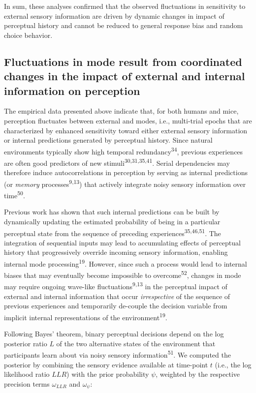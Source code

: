 \documentclass[
]{article}
\begin{document}
In sum, these analyses confirmed that the observed fluctuations in
sensitivity to external sensory information are driven by dynamic
changes in impact of perceptual history and cannot be reduced to general
response bias and random choice behavior.

\hypertarget{fluctuations-in-mode-result-from-coordinated-changes-in-the-impact-of-external-and-internal-information-on-perception}{%
\subsection{Fluctuations in mode result from coordinated changes in the
impact of external and internal information on
perception}\label{fluctuations-in-mode-result-from-coordinated-changes-in-the-impact-of-external-and-internal-information-on-perception}}

The empirical data presented above indicate that, for both humans and
mice, perception fluctuates between external and modes, i.e.,
multi-trial epochs that are characterized by enhanced sensitivity toward
either external sensory information or internal predictions generated by
perceptual history. Since natural environments typically show high
temporal redundancy\textsuperscript{34}, previous experiences are often
good predictors of new stimuli\textsuperscript{30,31,35,41}. Serial
dependencies may therefore induce autocorrelations in perception by
serving as internal predictions (or \emph{memory}
processes\textsuperscript{9,13}) that actively integrate noisy sensory
information over time\textsuperscript{50}.

Previous work has shown that such internal predictions can be built by
dynamically updating the estimated probability of being in a particular
perceptual state from the sequence of preceding
experiences\textsuperscript{35,46,51}. The integration of sequential
inputs may lead to accumulating effects of perceptual history that
progressively override incoming sensory information, enabling internal
mode processing\textsuperscript{19}. However, since such a process would
lead to internal biases that may eventually become impossible to
overcome\textsuperscript{52}, changes in mode may require ongoing
wave-like fluctuations\textsuperscript{9,13} in the perceptual impact of
external and internal information that occur \emph{irrespective} of the
sequence of previous experiences and temporarily de-couple the decision
variable from implicit internal representations of the
environment\textsuperscript{19}.

Following Bayes' theorem, binary perceptual decisions depend on the log
posterior ratio \(L\) of the two alternative states of the environment
that participants learn about via noisy sensory
information\textsuperscript{51}. We computed the posterior by combining
the sensory evidence available at time-point \(t\) (i.e., the log
likelihood ratio \(LLR\)) with the prior probability \(\psi\), weighted
by the respective precision terms \(\omega_{LLR}\) and
\(\omega_{\psi}\):
\end{document}
